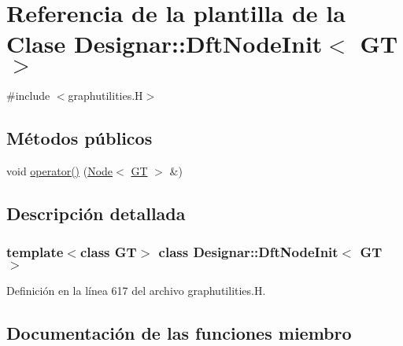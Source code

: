 \hypertarget{class_designar_1_1_dft_node_init}{}\section{Referencia de la plantilla de la Clase Designar\+:\+:Dft\+Node\+Init$<$ GT $>$}
\label{class_designar_1_1_dft_node_init}


{\ttfamily \#include $<$graphutilities.\+H$>$}

\subsection*{Métodos públicos}
\begin{DoxyCompactItemize}
\item 
void \hyperlink{class_designar_1_1_dft_node_init_a35335ab986752fee745a7f33ac285d4c}{operator()} (\hyperlink{namespace_designar_a5af326c65aa2bd26b26c410f2030d09e}{Node}$<$ \hyperlink{demo-buildgraph_8_c_a3001c40d2c31ca87ed96cd7d1334a55e}{GT} $>$ \&)
\end{DoxyCompactItemize}


\subsection{Descripción detallada}
\subsubsection*{template$<$class GT$>$\newline
class Designar\+::\+Dft\+Node\+Init$<$ G\+T $>$}



Definición en la línea 617 del archivo graphutilities.\+H.



\subsection{Documentación de las funciones miembro}
\mbox{\label{class_designar_1_1_dft_node_init_a35335ab986752fee745a7f33ac285d4c}} 
